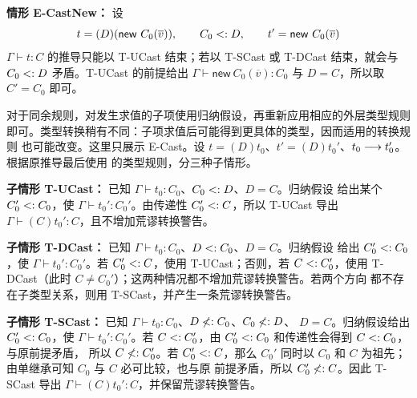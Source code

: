\begin{taplauthorsolutionentrybox}
\textbf{情形 E-CastNew：}
设
\[
 t=(D)(\mathsf{new}\ C_0(\overline v)),
 \qquad C_0\mathrel{<:} D,
 \qquad t'=\mathsf{new}\ C_0(\overline v)
\]
\(\Gamma\vdash t:C\) 的推导只能以 T-UCast 结束；若以 T-SCast 或
T-DCast 结束，就会与 \(C_0\mathrel{<:} D\) 矛盾。T-UCast 的前提给出
\(\Gamma\vdash\mathsf{new}\ C_0(\overline v):C_0\) 与 \(D=C\)，所以取
\(C'=C_0\) 即可。

对于同余规则，对发生求值的子项使用归纳假设，再重新应用相应的外层类型规则
即可。类型转换稍有不同：子项求值后可能得到更具体的类型，因而适用的转换规则
也可能改变。这里只展示 E-Cast。设
\(t=(D)t_0\)、\(t'=(D)t_0'\)、\(t_0\mathrel{\longrightarrow} t_0'\)。根据原推导最后使用
的类型规则，分三种子情形。

\textbf{子情形 T-UCast：}
已知 \(\Gamma\vdash t_0:C_0\)、\(C_0\mathrel{<:} D\)、\(D=C\)。归纳假设
给出某个 \(C_0'\mathrel{<:} C_0\)，使 \(\Gamma\vdash t_0':C_0'\)。由传递性
\(C_0'\mathrel{<:} C\)，所以 T-UCast 导出
\(\Gamma\vdash(C)t_0':C\)，且不增加荒谬转换警告。

\textbf{子情形 T-DCast：}
已知 \(\Gamma\vdash t_0:C_0\)、\(D\mathrel{<:} C_0\)、\(D=C\)。归纳假设
给出 \(C_0'\mathrel{<:} C_0\)，使 \(\Gamma\vdash t_0':C_0'\)。若
\(C_0'\mathrel{<:} C\)，使用 T-UCast；否则，若 \(C\mathrel{<:} C_0'\)，使用
T-DCast（此时 \(C\ne C_0'\)）；这两种情况都不增加荒谬转换警告。若两个方向
都不存在子类型关系，则用 T-SCast，并产生一条荒谬转换警告。

\textbf{子情形 T-SCast：}
已知 \(\Gamma\vdash t_0:C_0\)、\(D\mathrel{\not<:} C_0\)、\(C_0\mathrel{\not<:} D\)、
\(D=C\)。归纳假设给出 \(C_0'\mathrel{<:} C_0\)，使
\(\Gamma\vdash t_0':C_0'\)。若 \(C\mathrel{<:} C_0'\)，由
\(C_0'\mathrel{<:} C_0\) 和传递性会得到 \(C\mathrel{<:} C_0\)，与原前提矛盾，
所以 \(C\mathrel{\not<:} C_0'\)。若 \(C_0'\mathrel{<:} C\)，那么 \(C_0'\) 同时以
\(C_0\) 和 \(C\) 为祖先；由单继承可知 \(C_0\) 与 \(C\) 必可比较，也与原
前提矛盾，所以 \(C_0'\mathrel{\not<:} C\)。因此 T-SCast 导出
\(\Gamma\vdash(C)t_0':C\)，并保留荒谬转换警告。

\end{taplauthorsolutionentrybox}
